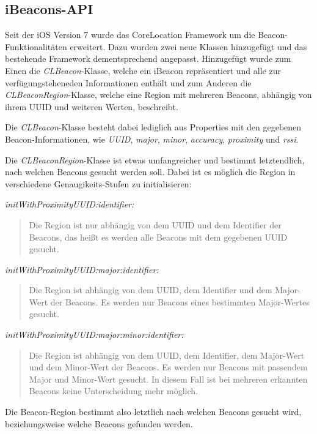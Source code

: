 \subsection{iBeacons-API}
\label{sec:technologies:corelocation:ibeaconsapi}
Seit der iOS Version 7 wurde das CoreLocation Framework um die Beacon-Funktionalitäten erweitert. 
Dazu wurden zwei neue Klassen hinzugefügt und das bestehende Framework dementsprechend angepasst. 
Hinzugefügt wurde zum Einen die \emph{CLBeacon}-Klasse, welche ein iBeacon repräsentiert und alle zur verfügungsteheneden Informationen enthält und zum Anderen die \emph{CLBeaconRegion}-Klasse, welche eine Region mit mehreren Beacons, abhängig von ihrem UUID und weiteren Werten, beschreibt.

Die \emph{CLBeacon}-Klasse besteht dabei lediglich aus Properties mit den gegebenen Beacon-Informationen, wie \emph{UUID}, \emph{major}, \emph{minor}, \emph{accuracy}, \emph{proximity} und \emph{rssi}.

Die \emph{CLBeaconRegion}-Klasse ist etwas umfangreicher und bestimmt letztendlich, nach welchen Beacons gesucht werden soll.
Dabei ist es möglich die Region in verschiedene Genaugikeits-Stufen zu initialisieren:


\emph{initWithProximityUUID:identifier:}\begin{quote}
	Die Region ist nur abhängig von dem UUID und dem Identifier der Beacons, das heißt es werden alle Beacons mit dem gegebenen UUID gesucht.
\end{quote}
\emph{initWithProximityUUID:major:identifier:}\begin{quote}
	Die Region ist abhängig von dem UUID, dem Identifier und dem Major-Wert der Beacons. Es werden nur Beacons eines bestimmten Major-Wertes gesucht.
\end{quote}
\emph{initWithProximityUUID:major:minor:identifier:}\begin{quote}
	Die Region ist abhängig von dem UUID, dem Identifier, dem Major-Wert und dem Minor-Wert der Beacons. Es werden nur Beacons mit passendem Major und Minor-Wert gesucht. In diesem Fall ist bei mehreren erkannten Beacons keine Unterscheidung mehr möglich.
\end{quote}

Die Beacon-Region bestimmt also letztlich nach welchen Beacons gesucht wird, beziehungsweise welche Beacons gefunden werden.


